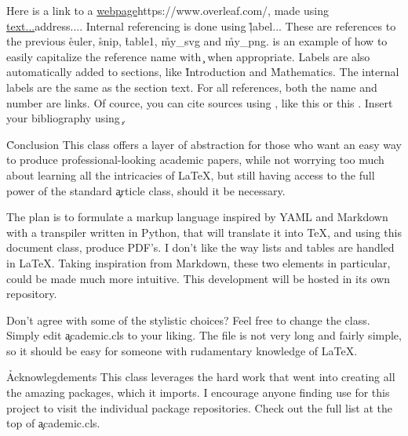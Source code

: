 \documentclass[article,twocolumn]{lix}
\begin{document}

Here is a link to a \url{webpage}{https://www.overleaf.com/}, made using \c{\url{text...}{address...}}. Internal referencing is done using \c{\r{label...}} These are references to the previous \r{euler}, \r{snip}, \r{table1}, \r{my_svg} and \r{my_png}.  is an example of how to easily capitalize the reference name with \c{} when appropriate. Labels are also automatically added to sections, like \r{Introduction} and \r{Mathematics}. The internal labels are the same as the section text. For all references, both the name and number are links. Of cource, you can cite sources using \c{\cite{...}}, like this \cite{minted} or this \cite{tabularray}. Insert your bibliography using \c{}.

\h{Conclusion}
This class offers a layer of abstraction for those who want an easy way to produce professional-looking academic papers, while not worrying too much about learning all the intricacies of LaTeX, but still having access to the full power of the standard \c{article} class, should it be necessary.

The plan is to formulate a markup language inspired by YAML and Markdown with a transpiler written in Python, that will translate it into TeX, and using this document class, produce PDF's. I don't like the way lists and tables are handled in LaTeX. Taking inspiration from Markdown, these two elements in particular, could be made much more intuitive. This development will be hosted in its own repository.

Don't agree with some of the stylistic choices? Feel free to change the class. Simply edit \c{academic.cls} to your liking. The file is not very long and fairly simple, so it should be easy for someone with rudamentary knowledge of LaTeX.

\h*{Acknowlegdements}
This class leverages the hard work that went into creating all the amazing packages, which it imports. I encourage anyone finding use for this project to visit the individual package repositories. Check out the full list at the top of \c{academic.cls}.
\end{document}
